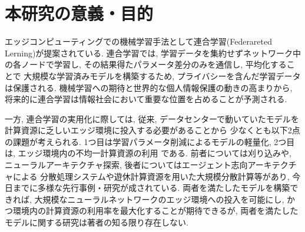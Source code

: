 \documentclass[a4paper,10.5pt,twocolumn]{jsarticle}
\begin{document}


\graphicspath{{./figs/}} %

\section{本研究の意義・目的}

エッジコンピューティングでの機械学習手法として連合学習(Federareted Lerning)が提案されている.
連合学習では, 学習データを集約せずネットワーク中の各ノードで学習し, 
その結果得たパラメータ差分のみを通信し, 平均化することで
大規模な学習済みモデルを構築するため, プライバシーを含んだ学習データは保護される.
機械学習への期待と世界的な個人情報保護の動きの高まりから, 
将来的に連合学習は情報社会において重要な位置を占めることが予測される.

一方, 連合学習の実用化に際しては, 
従来, データセンターで動いていたモデルを計算資源に乏しいエッジ環境に投入する必要があることから
少なくとも以下2点の課題が考えられる.
1つ目は学習パラメータ削減によるモデルの軽量化, 
2つ目は, エッジ環境内の不均一計算資源の利用
である.
前者については刈り込みや, ニューラルアーキテクチャ探索, 後者についてはエージェント志向アーキテクチャによる
分散処理システムや遊休計算資源を用いた大規模分散計算等があり, 
今日までに多様な先行事例・研究が成されている. 
両者を満たしたモデルを構築できれば, 
大規模なニューラルネットワークのエッジ環境への投入を可能にし, 
かつ環境内の計算資源の利用率を最大化することが期待できるが,  
両者を満たしたモデルに関する研究は著者の知る限り存在しない.
\end{document}
